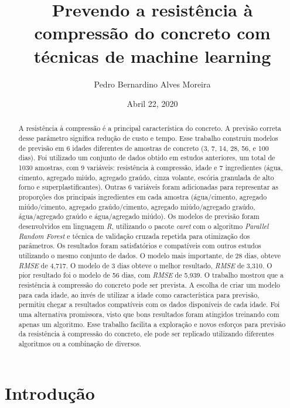 \documentclass[]{article}
\title{Prevendo a resistência à compressão do concreto com técnicas de machine
learning}
\author{Pedro Bernardino Alves Moreira}
\date{Abril 22, 2020}
\begin{document}
\maketitle
\begin{abstract}
A resistência à compressão é a principal característica do concreto. A
previsão correta desse parâmetro significa redução de custo e tempo.
Esse trabalho construiu modelos de previsão em 6 idades diferentes de
amostras de concreto (3, 7, 14, 28, 56, e 100 dias). Foi utilizado um
conjunto de dados obtido em estudos anteriores, um total de 1030
amostras, com 9 variáveis: resistência à compressão, idade e 7
ingredientes (água, cimento, agregado miúdo, agregado graúdo, cinza
volante, escória granulada de alto forno e superplastificantes). Outras
6 variáveis foram adicionadas para representar as proporções dos
principais ingredientes em cada amostra (água/cimento, agregado
miúdo/cimento, agregado graúdo/cimento, agregado miúdo/agregado graúdo,
água/agregado graúdo e água/agregado miúdo). Os modelos de previsão
foram desenvolvidos em linguagem \emph{R}, utilizando o pacote
\emph{caret} com o algoritmo \emph{Parallel Random Forest} e técnica de
validação cruzada repetida para otimização dos parâmetros. Os resultados
foram satisfatórios e compatíveis com outros estudos utilizando o mesmo
conjunto de dados. O modelo mais importante, de 28 dias, obteve
\emph{RMSE} de 4,717. O modelo de 3 dias obteve o melhor resultado,
\emph{RMSE} de 3,310. O pior resultado foi o modelo de 56 dias, com
\emph{RMSE} de 5,939. O trabalho mostrou que a resistência à compressão
do concreto pode ser prevista. A escolha de criar um modelo para cada
idade, ao invés de utilizar a idade como característica para previsão,
permitiu chegar a resultados compatíveis com os dados disponíveis de
cada idade. Foi uma alternativa promissora, visto que bons resultados
foram atingidos treinando com apenas um algoritmo. Esse trabalho
facilita a exploração e novos esforços para previsão da resistência à
compressão do concreto, ele pode ser replicado utilizando diferentes
algoritmos ou a combinação de diversos.
\end{abstract}

\renewcommand{\figurename}{Figura}
\renewcommand{\tablename}{Tabela}
\renewcommand{\contentsname}{Sumário}
\renewcommand{\chunkname}{Código}
\renewcommand{\listfigurename}{Lista de figuras}
\renewcommand{\listtablename}{Lista de tabelas}
\newpage
\tableofcontents
\newpage
\listoffigures
\listoftables
\newpage

\hypertarget{introduuxe7uxe3o}{%
\section{Introdução}\label{introduuxe7uxe3o}}
\end{document}
